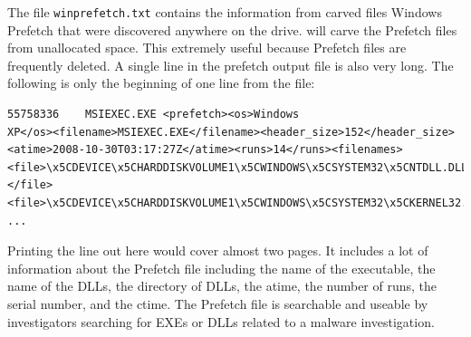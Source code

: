The file \texttt{winprefetch.txt} contains the information from carved files Windows Prefetch that were discovered anywhere on the drive. \bulk will carve the Prefetch files from unallocated space. This extremely useful because Prefetch files are frequently deleted. A single line in the prefetch output file is also very long. The following is only the beginning of one line from the file:
\lstset{style=customfile}
\begin{lstlisting}
55758336	MSIEXEC.EXE	<prefetch><os>Windows
XP</os><filename>MSIEXEC.EXE</filename><header_size>152</header_size>
<atime>2008-10-30T03:17:27Z</atime><runs>14</runs><filenames>
<file>\x5CDEVICE\x5CHARDDISKVOLUME1\x5CWINDOWS\x5CSYSTEM32\x5CNTDLL.DLL
</file><file>\x5CDEVICE\x5CHARDDISKVOLUME1\x5CWINDOWS\x5CSYSTEM32\x5CKERNEL32.DLL
...
\end{lstlisting}
Printing the line out here would cover almost two pages. It includes a lot of information about the Prefetch file including the name of the executable, the name of the DLLs, the directory of DLLs, the atime, the number of runs, the serial number, and the ctime. The Prefetch file is searchable and useable by investigators searching for EXEs or DLLs related to a malware investigation.\\

